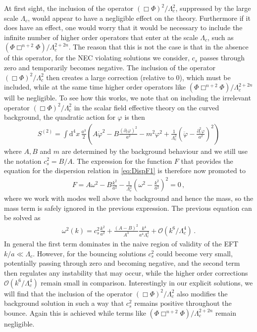 \documentclass[12pt]{article}
\def\ba{\begin{eqnarray}}
\def\ea{\end{eqnarray}}
\def\d{\mathrm{d}}
\def\({\left(}
\def\){\right)}
\begin{document}
At first sight, the inclusion of the operator $(\Box \Phi)^2/\Lambda_c^2$, suppressed by the large scale $\Lambda_c$, would appear to have a negligible effect on the theory. Furthermore if it does have an effect, one would worry that it would be necessary to include the infinite number of higher order operators that enter at the scale $\Lambda_c$, such as $(\Phi \Box^{n+2} \Phi)/\Lambda_c^{2+2n}$. The reason that this is not the case is that in the absence of this operator, for the NEC violating solutions we consider, $c_s$ passes through zero and temporarily becomes negative. The inclusion of the operator $(\Box \Phi)^2/\Lambda_c^2$ then creates a large correction (relative to 0), which must be included, while at the same time higher order operators like $(\Phi \Box^{n+2} \Phi)/\Lambda_c^{2+2n}$ will be negligible. To see how this works, we note that on including the irrelevant operator $(\Box \Phi)^2/\Lambda_c^2$  in the scalar field effective theory on the curved background, the quadratic action for $\varphi$ is then
\ba
\label{eq:S2}
 S^{(2)} = \int \d^4 x \, \frac{a^3}{2} \left(  A \dot \varphi^2 - B \frac{ (\partial_i \varphi )^2}{a^2} -  m^2 \varphi^2 + \frac{1}{ \Lambda_c^2} \left(  \ddot \varphi -  \frac{  \partial_i^2 \varphi}{a^2}  \right)^2 \right)
\ea
where $A,B$ and $m$ are determined by the background behaviour and we still use the notation  $c_s^2=B/A$.
The expression for the function $F$ that provides the equation for the dispersion relation in \eqref{eq:DispF1} is therefore now promoted to
\ba
\label{eq:DispF2}
F=A \omega^2-B\frac{k^2}{a^2}-\frac{1}{\Lambda_c^2}\(\omega^2-\frac{k^2}{a^2}\)^2=0\,,
\ea
where we work with modes well above the background and hence the mass, so the mass term is safely ignored in the previous expression.
The previous equation can be solved as
\ba
\label{eq:omegaGhost}
\omega^2(k)=c_s^2 \frac{k^2}{a^2}+\frac{(A-B)^2}{A^3}\frac{k^4}{a^4\Lambda_c^2} +\mathcal{O}\(k^6/\Lambda_c^4\)\,.
\ea
In general the first term dominates in the naive region of validity of the EFT $k/a \ll \Lambda_c$. However, for the bouncing solutions $c_s^2$ could become very small, potentially passing through zero and becoming negative, and the second term then regulates any instability that may occur, while the higher order corrections $\mathcal{O}(k^6/\Lambda_c^4)$ remain small in comparison.
Interestingly in our explicit solutions, we will find that the inclusion of the operator $(\Box \Phi)^2/\Lambda_c^2$ also modifies the background solution in such a way that $c_s^2$ remains positive throughout the bounce. Again this is achieved while terms like $(\Phi \Box^{n+2} \Phi)/\Lambda_c^{2+2n}$ remain negligible. \\
\end{document}
